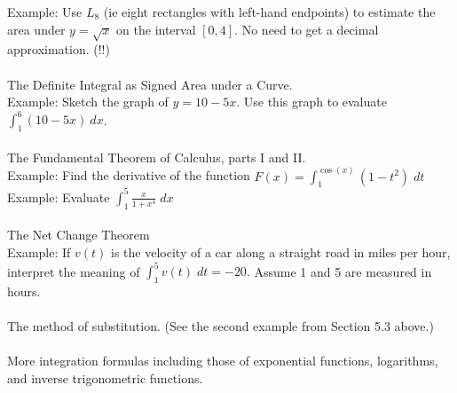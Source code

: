 \documentclass[11pt,fleqn]{article}
\begin{document}
Example: Use $L_8$ (ie eight rectangles with left-hand endpoints) to estimate the area under $y=\sqrt{x}$ on the interval $[0,4].$ No need to get a decimal approximation. (!!)\\


\noindent {}\\
The Definite Integral as Signed Area under a Curve.\\

Example: Sketch the graph of $y=10 - 5x.$ Use this graph to evaluate $\int_{1}^6 (10-5x) \:dx$.\\

\noindent {}\\
The Fundamental Theorem of Calculus, parts I and II.\\

Example: Find the derivative of the function $F(x)=\int_1^{\cos(x)} (1-t^2) \; dt$\\

Example: Evaluate $\int_1^5 \frac{x}{1+x^4} \; dx$\\

\noindent {}\\
The Net Change Theorem\\

Example: If $v(t)$ is the velocity of a car along a straight road in miles per hour, interpret the meaning of $\int_1^5 v(t) \; dt = -20.$ Assume 1 and 5 are measured in hours. \\

\noindent {}\\
The method of substitution. (See the second example from Section 5.3 above.)\\

\noindent {}\\
More integration formulas including those of exponential functions, logarithms, and inverse trigonometric functions.
\end{document}

